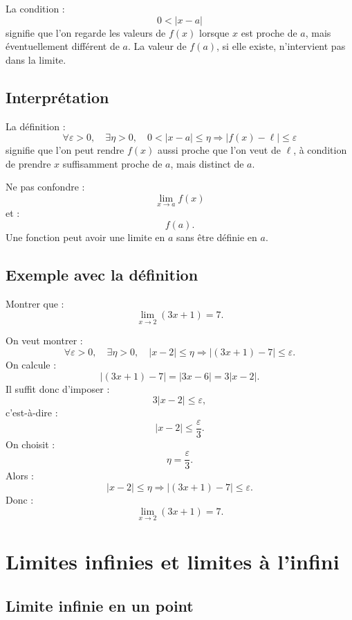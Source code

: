 \documentclass[11pt,a4paper]{article}
\newcommand{\implique}{\Longrightarrow}
\begin{document}
\begin{retenirbox}
La condition :
\[
0<|x-a|
\]
signifie que l'on regarde les valeurs de \(f(x)\) lorsque \(x\) est proche de \(a\), mais éventuellement différent de \(a\).  
La valeur de \(f(a)\), si elle existe, n'intervient pas dans la limite.
\end{retenirbox}

\subsection{Interprétation}

La définition :
\[
\forall \varepsilon>0,\quad \exists \eta>0,\quad
0<|x-a|\leq\eta\implique |f(x)-\ell|\leq\varepsilon
\]
signifie que l'on peut rendre \(f(x)\) aussi proche que l'on veut de \(\ell\), à condition de prendre \(x\) suffisamment proche de \(a\), mais distinct de \(a\).

\begin{erreurbox}
Ne pas confondre :
\[
\lim_{x\to a}f(x)
\]
et :
\[
f(a).
\]
Une fonction peut avoir une limite en \(a\) sans être définie en \(a\).
\end{erreurbox}

\subsection{Exemple avec la définition}

\begin{exercicebox}
Montrer que :
\[
\lim_{x\to 2}(3x+1)=7.
\]
\end{exercicebox}

\begin{correctionbox}
On veut montrer :
\[
\forall\varepsilon>0,\quad \exists\eta>0,\quad |x-2|\leq\eta\implique |(3x+1)-7|\leq\varepsilon.
\]
On calcule :
\[
|(3x+1)-7|=|3x-6|=3|x-2|.
\]
Il suffit donc d'imposer :
\[
3|x-2|\leq\varepsilon,
\]
c'est-à-dire :
\[
|x-2|\leq\frac{\varepsilon}{3}.
\]
On choisit :
\[
\eta=\frac{\varepsilon}{3}.
\]
Alors :
\[
|x-2|\leq\eta
\implique
|(3x+1)-7|\leq\varepsilon.
\]
Donc :
\[
\lim_{x\to2}(3x+1)=7.
\]
\end{correctionbox}

\section{Limites infinies et limites à l'infini}

\subsection{Limite infinie en un point}
\end{document}
